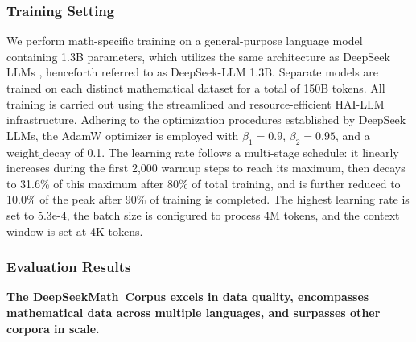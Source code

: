 \subsubsection{Training Setting}
\label{sec:quality-policy}
We perform math-specific training on a general-purpose language model containing 1.3B parameters, which utilizes the same architecture as DeepSeek LLMs \citep{deepseek-llm}, henceforth referred to as DeepSeek-LLM 1.3B. Separate models are trained on each distinct mathematical dataset for a total of 150B tokens. All training is carried out using the streamlined and resource-efficient HAI-LLM \citep{haillm} infrastructure. Adhering to the optimization procedures established by DeepSeek LLMs, the AdamW optimizer \citep{adamW} is employed with $\beta_1=0.9$, $\beta_2=0.95$, and a $\mathrm{weight\_decay}$ of 0.1. The learning rate follows a multi-stage schedule: it linearly increases during the first 2,000 warmup steps to reach its maximum, then decays to 31.6\% of this maximum after 80\% of total training, and is further reduced to 10.0\% of the peak after 90\% of training is completed. The highest learning rate is set to 5.3e-4, the batch size is configured to process 4M tokens, and the context window is set at 4K tokens.

\subsubsection{Evaluation Results}

\textbf{The DeepSeekMath~Corpus excels in data quality, encompasses mathematical data across multiple languages, and surpasses other corpora in scale.}

